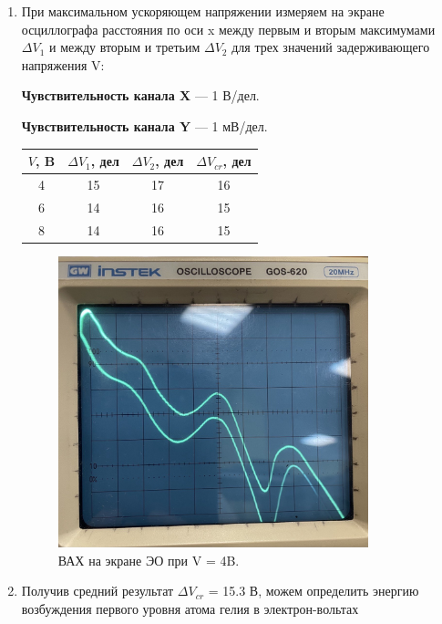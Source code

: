 \documentclass[a4paper,12pt]{article}
\begin{document}
 
 \begin{enumerate}
\item При максимальном ускоряющем напряжении измеряем на экране осциллографа расстояния по оси x между первым и вторым максимумами $\Delta{V_1}$ и между вторым и третьим $\Delta{V_2}$ для трех значений задерживающего напряжения V:
  
\textbf{Чувствительность канала X} — 1 В/дел.

\textbf{Чувствительность канала Y} — 1 мВ/дел.

  \begin{table}[H]
\begin{center}
\begin{tabular}{|c|c|c|c|}
\hline $V $, B&$\Delta{V_1}$, дел &$\Delta{V_2}$, дел& $\Delta{V_{cr}}$, дел\\
\hline 4&15&17&16\\
\hline 6&14&16&15\\
\hline 8&14&16&15\\
\hline 
\end{tabular}
\end{center}
\end{table}

    \begin{figure}[H]
  \begin{center}
    \includegraphics[width=9cm]{ex3.jpg}
    \caption{ВАХ на экране ЭО при V = 4B.}
    \label{fig:}
  \end{center}
\end{figure}

\item Получив средний результат $\Delta{V_{cr}}$ = 15.3 В, можем определить энергию возбуждения первого уровня атома гелия в электрон-вольтах


\end{enumerate}
\end{document}
